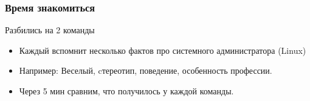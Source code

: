 \begin{frame}
\frametitle{Время знакомиться}
    Разбились на 2 команды
\begin{itemize}
    \item Каждый вспомнит несколько фактов про системного администратора (Linux)
    \item Например: Веселый, cтереотип, поведение, особенность профессии.
    \item Через 5 мин сравним, что получилось у каждой команды.
\end{itemize}
\end{frame}
